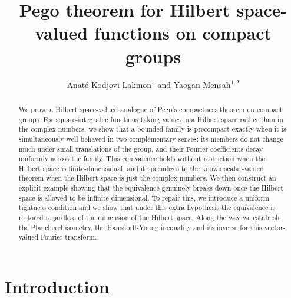 \documentclass[11pt]{amsart}
\begin{document}
\title[Pego theorem for Hilbert space-valued functions on compact groups]{Pego theorem for Hilbert space-valued functions on compact groups}
\author{Anat\'e Kodjovi Lakmon$^1$ and Yaogan Mensah$^{1,2}$}

\address{$^1$ Department of Mathematics, University of Lom\'e, Lom\'e,  Togo}
\address{$^2$ ICMPA-Unesco-Chair, University of Abomey-Calavi, Calavi, Benin}







\begin{abstract}
We prove a Hilbert space-valued analogue of Pego's compactness theorem on compact groups. For square-integrable functions taking values in a Hilbert space  rather than in the complex numbers, we show that a bounded family is precompact exactly when it is simultaneously well behaved in two complementary senses: its members do not change much under small translations of the group, and their Fourier coefficients decay uniformly across the family. This  equivalence holds without restriction when  the Hilbert space is finite-dimensional, and it specializes to the known scalar-valued theorem when the Hilbert space is just the complex numbers. We then construct an explicit example showing that the equivalence genuinely breaks down once the Hilbert space is allowed to be infinite-dimensional.  To repair this, we introduce a uniform tightness condition and we show that under this extra hypothesis the equivalence is restored regardless of the dimension of the Hilbert space. Along the way we establish the Plancherel isometry, the Hausdorff-Young inequality and its inverse for this vector-valued Fourier transform. 
\end{abstract}


\maketitle


\section{Introduction}
\end{document}
